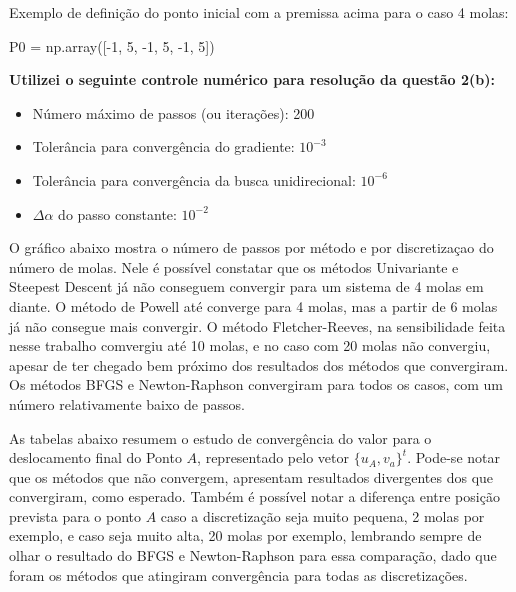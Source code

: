 \documentclass[10pt, a4paper]{article}
\begin{document}
Exemplo de definição do ponto inicial com a premissa acima para o caso 4 molas:

\begin{python}
  P0 = np.array([-1, 5, -1, 5, -1, 5])
\end{python}

\textbf{Utilizei o seguinte controle numérico para resolução da questão 2(b):}
\begin{itemize}
  \item Número máximo de passos (ou iterações): 200
  \item Tolerância para convergência do gradiente: $10^{-3}$
  \item Tolerância para convergência da busca unidirecional: $10^{-6}$
  \item $\Delta\alpha$ do passo constante: $10^{-2}$
\end{itemize}

O gráfico abaixo mostra o número de passos por método e por discretizaçao do número de molas. Nele é possível
constatar que os métodos Univariante e Steepest Descent já não conseguem convergir para um sistema de 4 molas em diante.
O método de Powell até converge para 4 molas, mas a partir de 6 molas já não consegue mais convergir. O método Fletcher-Reeves,
na sensibilidade feita nesse trabalho comvergiu até 10 molas, e no caso com 20 molas não convergiu, apesar de ter chegado
bem próximo dos resultados dos métodos que convergiram. Os métodos BFGS e
Newton-Raphson convergiram para todos os casos, com um número relativamente baixo de passos.


As tabelas abaixo resumem o estudo de convergência do valor para o deslocamento final do Ponto $A$, representado pelo
vetor $\{u_A, v_a\}^t$. Pode-se notar que os métodos que não convergem, apresentam resultados divergentes dos que convergiram,
como esperado. Também é possível notar a diferença entre posição prevista para o ponto $A$ caso a discretização seja muito
pequena, 2 molas por exemplo, e caso seja muito alta, 20 molas por exemplo, lembrando sempre de olhar o resultado do BFGS
e Newton-Raphson para essa comparação, dado que foram os métodos que atingiram convergência para todas as discretizações.
\end{document}
